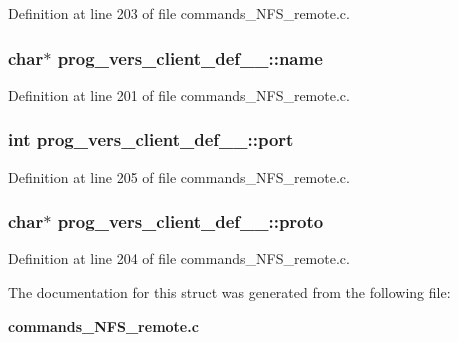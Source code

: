 Definition at line 203 of file commands\_\-NFS\_\-remote.c.
\subsubsection[{name}]{\setlength{\rightskip}{0pt plus 5cm}char$\ast$ {\bf prog\_\-vers\_\-client\_\-def\_\-\_\-::name}}\label{structprog__vers__client__def_____a50aee1a2d3050045bcb931eb62c1929}




Definition at line 201 of file commands\_\-NFS\_\-remote.c.
\subsubsection[{port}]{\setlength{\rightskip}{0pt plus 5cm}int {\bf prog\_\-vers\_\-client\_\-def\_\-\_\-::port}}\label{structprog__vers__client__def_____b0af7d0082b3e2f63559f77a473b0aa7}




Definition at line 205 of file commands\_\-NFS\_\-remote.c.
\subsubsection[{proto}]{\setlength{\rightskip}{0pt plus 5cm}char$\ast$ {\bf prog\_\-vers\_\-client\_\-def\_\-\_\-::proto}}\label{structprog__vers__client__def_____051a5345c6bd0852ca5664c689bf9cd1}




Definition at line 204 of file commands\_\-NFS\_\-remote.c.

The documentation for this struct was generated from the following file:\begin{CompactItemize}
\item 
{\bf commands\_\-NFS\_\-remote.c}\end{CompactItemize}
